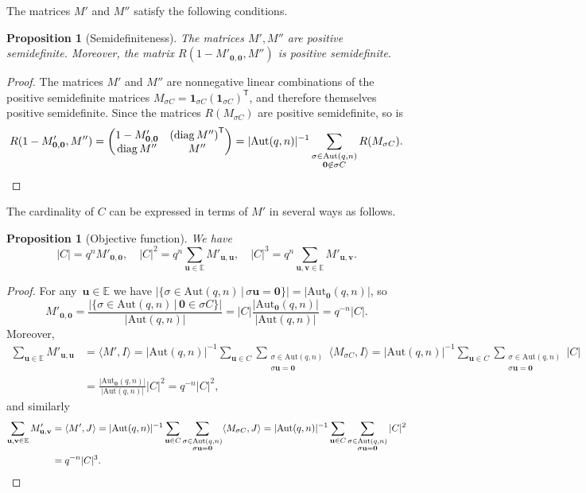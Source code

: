 \documentclass[10pt,a4paper]{article}
\newcommand{\E}{\mathbb{E}}
\newcommand{\one}{\mathbf{1}}
\newtheorem{proposition}[theorem]{Proposition}
\theoremstyle{definition}
\newcommand{\uu}{\mathbf{u}}
\newcommand{\vv}{\mathbf{v}}
\newcommand{\zero}{\mathbf{0}}
\newcommand{\inner}[2]{\langle#1,#2\rangle}
\newcommand{\Aut}{\mathrm{Aut}}
\newcommand{\AutZ}{\mathrm{Aut}_{\zero}}
\newcommand{\T}{^{\mathsf{T}}}
\DeclareMathOperator*{\diag}{diag}
\begin{document}
The matrices $M'$ and $M''$ satisfy the following conditions.
\begin{proposition}[Semidefiniteness]\label{prop:second}
The matrices $M',M''$ are positive semidefinite. Moreover, the matrix $R(1-M'_{\zero,\zero},M'')$ is positive semidefinite.
\end{proposition}
\begin{proof}
The matrices $M'$ and $M''$ are nonnegative linear combinations of the positive semidefinite matrices $M_{\sigma C}=\one_{\sigma C}(\one_{\sigma C})\T$, and therefore themselves positive semidefinite. Since the matrices $R(M_{\sigma C})$ are positive semidefinite, so is 
\[
R(1-M'_{\zero,\zero},M'')=\begin{pmatrix}1-M'_{\zero,\zero}&\left(\diag M''\right)\T\\\diag M''&M''\end{pmatrix}=|\Aut(q,n)|^{-1} \sum_{\substack{\sigma \in \Aut(q,n)\\ \zero \not\in \sigma C }} R(M_{\sigma C}). \qedhere
\]
\end{proof}

The cardinality of $C$ can be expressed in terms of $M'$ in several ways as follows.
\begin{proposition}[Objective function]
We have 
\[|C|=q^nM'_{\zero,\zero},\quad |C|^2=q^n\sum_{\uu\in\E}M'_{\uu,\uu},\quad |C|^3=q^n\sum_{\uu,\vv\in \E}M'_{\uu,\vv}.
\]
\end{proposition}
\begin{proof}
For any~$\uu \in \E$ we have $|\{\sigma \in \Aut(q,n) \, | \, \sigma \uu = \zero\}| = |\AutZ(q,n)|$, so
\[
M'_{\zero,\zero} = \frac{|\{\sigma \in \Aut(q,n) \, | \,  \zero \in \sigma C\}|}{|\Aut(q,n)|} =|C|\frac{|\AutZ(q,n)|}{|\Aut(q,n)|} =q^{-n}|C|.
\]
Moreover, 
\begin{align*}
\sum_{\uu\in\E}M'_{\uu,\uu} &= \inner{M'}{I} = |\Aut(q,n)|^{-1} \sum_{\uu \in C} \sum_{\substack{\sigma \in \Aut(q,n)\\ \sigma \uu = \zero}} \inner{M_{\sigma C}}{I} =|\Aut(q,n)|^{-1} \sum_{\uu \in C} \sum_{\substack{\sigma \in \Aut(q,n)\\ \sigma \uu = \zero}} |C| 
\\&=\frac{|\AutZ(q,n)|}{|\Aut(q,n)|}|C|^2 =q^{-n}|C|^2,
\end{align*}
and similarly
\begin{align*}
 \sum_{\uu, \vv \in\E}M'_{\uu,\vv} &= \inner{M'}{J}  = |\Aut(q,n)|^{-1} \sum_{\uu \in C} \sum_{\substack{\sigma \in \Aut(q,n)\\ \sigma \uu = \zero}} \inner{M_{\sigma C}}{J} =|\Aut(q,n)|^{-1} \sum_{\uu \in C} \sum_{\substack{\sigma \in \Aut(q,n)\\ \sigma \uu = \zero}} |C|^2 \\&=q^{-n}|C|^3.
 \qedhere 
\end{align*}
\end{proof}
\end{document}
